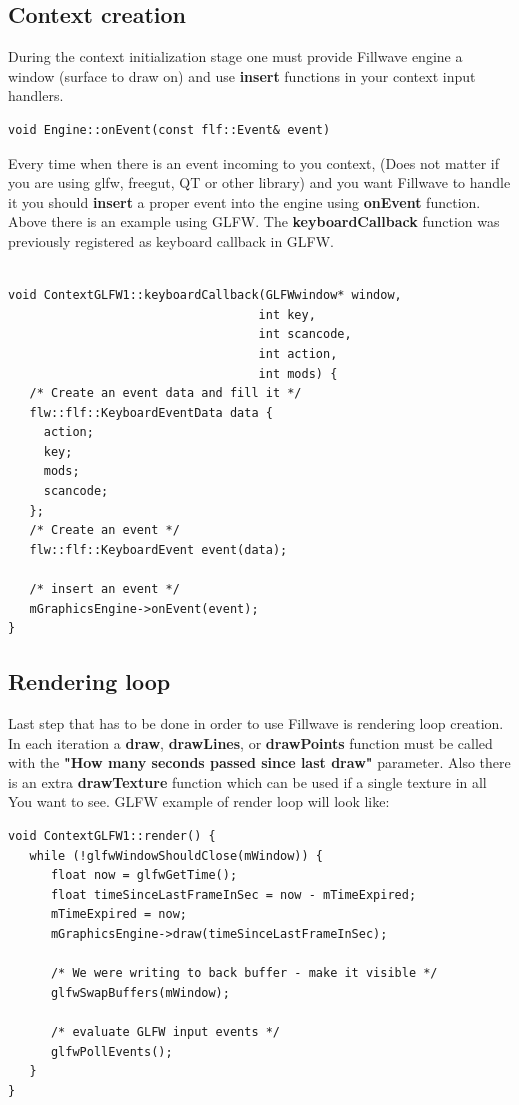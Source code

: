 \documentclass{article}
\begin{document}
\subsection{Context creation}\label{sec:Context}
\indent \indent During the context initialization stage one must provide Fillwave engine a window (surface to draw on) and use \textbf{insert} functions in your context input handlers.

\begin{lstlisting}
void Engine::onEvent(const flf::Event& event)
\end{lstlisting}

\indent \indent Every time when there is an event incoming to you context, (Does not matter if you are using glfw, freegut, QT or other library) and you want Fillwave to handle it you should \textbf{insert} a proper event into the engine using \textbf{onEvent} function. Above there is an example using GLFW. The \textbf{keyboardCallback} function was previously registered as keyboard callback in GLFW.  

\begin{lstlisting}

void ContextGLFW1::keyboardCallback(GLFWwindow* window,
                                   int key,
                                   int scancode,
                                   int action,
                                   int mods) {
   /* Create an event data and fill it */
   flw::flf::KeyboardEventData data {
     action;
     key;
     mods;
     scancode;
   };
   /* Create an event */
   flw::flf::KeyboardEvent event(data);
   
   /* insert an event */
   mGraphicsEngine->onEvent(event);
}
\end{lstlisting}

\subsection{Rendering loop}\label{sec:Loop}

\indent \indent Last step that has to be done in order to use Fillwave is rendering loop creation. In each iteration a \textbf{draw}, \textbf{drawLines}, or \textbf{drawPoints} function must be called with the \textbf{"How many seconds passed since last draw"} parameter. Also there is an extra \textbf{drawTexture} function which can be used if a single texture in all You want to see. GLFW example of render loop will look like:

\begin{lstlisting}
void ContextGLFW1::render() {
   while (!glfwWindowShouldClose(mWindow)) {
      float now = glfwGetTime();
      float timeSinceLastFrameInSec = now - mTimeExpired;
      mTimeExpired = now;
      mGraphicsEngine->draw(timeSinceLastFrameInSec);

      /* We were writing to back buffer - make it visible */
      glfwSwapBuffers(mWindow);
      
      /* evaluate GLFW input events */
      glfwPollEvents();
   }
}
\end{lstlisting}
\end{document}
